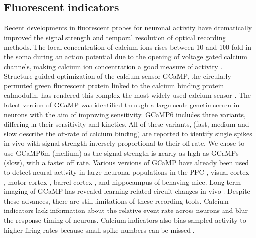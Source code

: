 \subsection{Fluorescent indicators}
Recent developments in fluorescent probes for neuronal activity have dramatically improved the signal strength and temporal resolution of optical recording methods. The local concentration of calcium ions rises between 10 and 100 fold in the soma during an action potential due to the opening of voltage gated calcium channels, making calcium ion concentration a good measure of activity \citep{Berridge2000}. Structure guided optimization of the calcium sensor GCaMP, the circularly permuted green fluorescent protein linked to the calcium binding protein calmodulin, has rendered this complex the most widely used calcium sensor \citep{Ding2014}. The latest version of GCaMP was identified through a large scale genetic screen in neurons with the aim of improving sensitivity. GCaMP6 includes three variants, differing in their sensitivity and kinetics. All of these variants, (fast, medium and slow describe the off-rate of calcium binding) are reported to identify single spikes in vivo with signal strength inversely proportional to their off-rate. We chose to use GCaMP6m (medium) as the signal strength is nearly as high as GCaMPs (slow), with a faster off rate.  Various versions of GCaMP have already been used to detect neural activity in large neuronal populations in the PPC \citep{Harvey:2012du}, visual cortex \citep{Andermann2010}, motor cortex \citep{Komiyama2010, Huber2012, Peters2014}, barrel cortex \citep{Margolis2012, Peron2015a}, and hippocampus \citep{Ziv2013} of behaving mice. Long-term imaging of GCaMP has revealed learning-related circuit changes in vivo \citep{Makino2015, Peters2014}. Despite these advances, there are still limitations of these recording tools. Calcium indicators lack information about the relative event rate across neurons and blur the response timing of neurons. Calcium indicators also bias sampled activity to higher firing rates because small spike numbers can be missed \citep{Cossart2005, Grienberger2012}.

\bigskip

